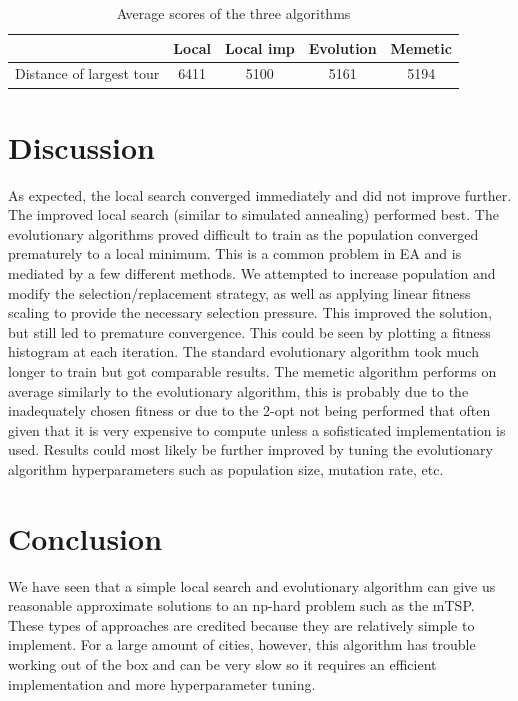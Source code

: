 \documentclass[journal]{IEEEtrancz}
\begin{document}
\begin{table}
  \centering
  \caption{Average scores of the three algorithms}
  \begin{tabular}{|l||c|c|c|c|}
  \hline
    & Local & Local imp & Evolution & Memetic\\
  \hline
  \hline
  Distance of largest tour  & 6411 & 5100 & 5161 & 5194 \\
  \hline
  \end{tabular}
  \label{tab:extab}
\end{table}


\section{Discussion}
As expected, the local search converged immediately and did not improve further. The improved local search (similar to simulated annealing) performed best.
The evolutionary algorithms proved difficult to train as the population converged prematurely to a local minimum. This is a common problem in EA and is mediated by a few different methods. We attempted to increase population and modify the selection/replacement strategy, as well as applying linear fitness scaling to provide the necessary selection pressure. This improved the solution, but still led to premature convergence. This could be seen by plotting a fitness histogram at each iteration. The standard evolutionary algorithm took much longer to train but got comparable results. The memetic algorithm performs on average similarly to the evolutionary algorithm, this is probably due to the inadequately chosen fitness or due to the 2-opt not being performed that often given that it is very expensive to compute unless a sofisticated implementation is used. Results could most likely be further improved by tuning the evolutionary algorithm hyperparameters such as population size, mutation rate, etc. \\


\section{Conclusion}
We have seen that a simple local search and evolutionary algorithm can give us reasonable approximate solutions to an np-hard problem such as the mTSP. These types of approaches are credited because they are relatively simple to implement. For a large amount of cities, however, this algorithm has trouble working out of the box and can be very slow so it requires an efficient implementation and more hyperparameter tuning.
\end{document}
